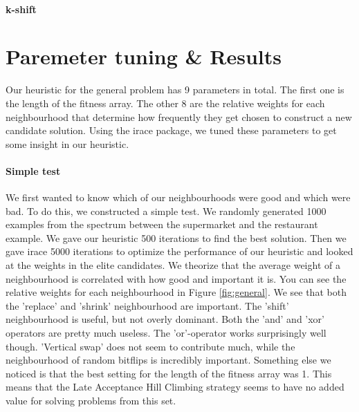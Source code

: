 \documentclass[]{article}
\begin{document}
\paragraph{k-shift}

\section{Paremeter tuning \& Results}
Our heuristic for the general problem has 9 parameters in total. The first one is the length of the fitness array. The other 8 are the relative weights for each neighbourhood that determine how frequently they get chosen to construct a new candidate solution. Using the irace package, we tuned these parameters to get some insight in our heuristic.

\paragraph{Simple test}
We first wanted to know which of our neighbourhoods were good and which were bad. To do this, we constructed a simple test. We randomly generated 1000 examples from the spectrum between the supermarket and the restaurant example. We gave our heuristic 500 iterations to find the best solution. Then we gave irace 5000 iterations to optimize the performance of our heuristic and looked at the weights in the elite candidates. We theorize that the average weight of a neighbourhood is correlated with how good and important it is. You can see the relative weights for each neighbourhood in Figure \ref{fig:general}. We see that both the 'replace' and 'shrink' neighbourhood are important. The 'shift' neighbourhood is useful, but not overly dominant. Both the 'and' and 'xor' operators are pretty much useless. The 'or'-operator works surprisingly well though. 'Vertical swap' does not seem to contribute much, while the neighbourhood of random bitflips is incredibly important. Something else we noticed is that the best setting for the length of the fitness array was 1. This means that the Late Acceptance Hill Climbing strategy seems to have no added value for solving problems from this set.

\end{document}

